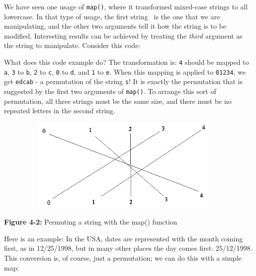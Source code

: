 We have seen one usage of
\texttt{map()}, where it transformed mixed-case strings to
all lowercase. In that type of usage, the first string \ is the one
that we are manipulating, and the other two arguments tell it how the
string is to be modified. Interesting results can be achieved by
treating the \textit{third} argument as the string to manipulate.
Consider this code:


What does this code example do? The transformation is:
\texttt{{\textquotedbl}4{\textquotedbl}} should be mapped to
\texttt{{\textquotedbl}a{\textquotedbl}},
\texttt{{\textquotedbl}3{\textquotedbl}} to
\texttt{{\textquotedbl}b{\textquotedbl}},
\texttt{{\textquotedbl}2{\textquotedbl}} to
\texttt{{\textquotedbl}c{\textquotedbl}},
\texttt{{\textquotedbl}0{\textquotedbl}} to
\texttt{{\textquotedbl}d{\textquotedbl}}, and
\texttt{{\textquotedbl}1{\textquotedbl}} to
\texttt{{\textquotedbl}e{\textquotedbl}}. When this mapping is applied
to \texttt{{\textquotedbl}01234{\textquotedbl}}, we get
\texttt{{\textquotedbl}edcab{\textquotedbl}} - a permutation of the
string \texttt{s}! It is exactly the permutation that is suggested by
the first two arguments of \texttt{map()}. To arrange this sort of
permutation, all three strings must be the same size, and there must be
no repeated letters in the second string.


\begin{center}
\includegraphics[width=5.0in,height=1.8in]{ub-img/ub-img9.png}
\end{center}
{\sffamily\bfseries Figure 4-2:}
{\sffamily Permuting a string with the map() function}

\bigskip

Here is an example: In the USA, dates are represented with the month
coming first, as in 12/25/1998, but in many other places the day comes
first: 25/12/1998. This conversion is, of course, just a permutation;
we can do this with a simple map:

